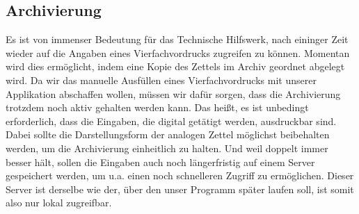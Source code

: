 \subsection{Archivierung}
Es ist von immenser Bedeutung für das Technische Hilfswerk, nach eininger Zeit wieder auf die Angaben eines Vierfachvordrucks
zugreifen zu können. Momentan wird dies ermöglicht, indem eine Kopie des Zettels im Archiv geordnet abgelegt wird. Da wir das manuelle Ausfüllen eines Vierfachvordrucks mit unserer Applikation abschaffen wollen, müssen wir dafür sorgen, dass die Archivierung trotzdem noch aktiv gehalten werden kann. Das heißt, es ist unbedingt erforderlich, dass die Eingaben, die digital getätigt werden, ausdruckbar sind. Dabei sollte die Darstellungsform der analogen Zettel möglichst beibehalten werden, um die Archivierung einheitlich zu halten. Und weil doppelt immer besser hält, sollen die Eingaben auch noch längerfristig auf einem Server gespeichert werden, um u.a. einen noch schnelleren Zugriff zu ermöglichen. Dieser Server ist derselbe wie der, über den unser Programm später laufen soll, ist somit also nur lokal zugreifbar.